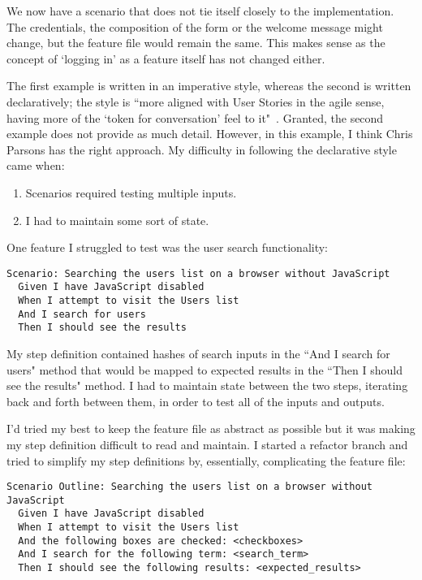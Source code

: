 We now have a scenario that does not tie itself closely to the implementation. The credentials, the composition of the form or the welcome message might change, but the feature file would remain the same. This makes sense as the concept of `logging in' as a feature itself has not changed either. 

The first example is written in an imperative style, whereas the second is written declaratively; the style is ``more aligned with User Stories in the agile sense, having more of the `token for conversation' feel to it"~\cite{appendix:cucumber:imperative}. Granted, the second example does not provide as much detail. However, in this example, I think Chris Parsons has the right approach.
My difficulty in following the declarative style came when:

\begin{enumerate}
\item Scenarios required testing multiple inputs.
\item I had to maintain some sort of state.
\end{enumerate}

One feature I struggled to test was the user search functionality:

\begin{lstlisting}
Scenario: Searching the users list on a browser without JavaScript
  Given I have JavaScript disabled
  When I attempt to visit the Users list
  And I search for users
  Then I should see the results
 \end{lstlisting}

My step definition contained hashes of search inputs in the ``And I search for users" method that would be mapped to expected results in the ``Then I should see the results" method. I had to maintain state between the two steps, iterating back and forth between them, in order to test all of the inputs and outputs.

I'd tried my best to keep the feature file as abstract as possible but it was making my step definition difficult to read and maintain. I started a refactor branch and tried to simplify my step definitions by, essentially, complicating the feature file:

\begin{lstlisting}
Scenario Outline: Searching the users list on a browser without JavaScript
  Given I have JavaScript disabled
  When I attempt to visit the Users list
  And the following boxes are checked: <checkboxes>
  And I search for the following term: <search_term>
  Then I should see the following results: <expected_results>
\end{lstlisting}

